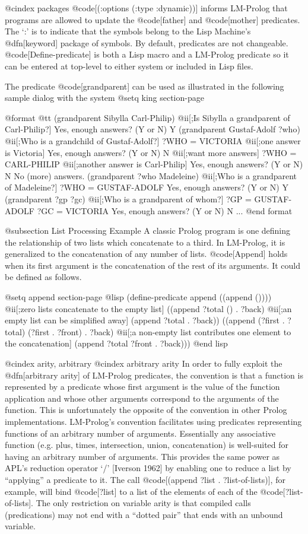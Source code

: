 {@cindex packages
@code[(:options (:type :dynamic))] informs LM-Prolog that programs are
allowed to update the @code[father] and @code[mother] predicates.
The `:' is to indicate that the symbols belong to the Lisp Machine's 
@dfn[keyword] package of symbols.
By default, predicates are not changeable.
@code[Define-predicate] is both a Lisp macro
and a LM-Prolog predicate so it can be
entered at top-level to either system or included in Lisp files.

The predicate @code[grandparent] can be used as illustrated in the following
sample dialog with the system
@setq king section-page

@format
@tt
(grandparent Sibylla Carl-Philip) @ii[;Is Sibylla a grandparent of Carl-Philip?]
Yes, enough answers? (Y or N) Y
(grandparent Gustaf-Adolf ?who) @ii[;Who is a grandchild of Gustaf-Adolf?]
?WHO = VICTORIA @ii[;one answer is Victoria]
Yes, enough answers? (Y or N) N @ii[;want more answers]
?WHO = CARL-PHILIP @ii[;another answer is Carl-Philip]
Yes, enough answers? (Y or N) N
No (more) answers.
(grandparent ?who Madeleine) @ii[;Who is a grandparent of Madeleine?]
?WHO = GUSTAF-ADOLF
Yes, enough answers? (Y or N) Y
(grandparent ?gp ?gc) @ii[;Who is a grandparent of whom?]
?GP = GUSTAF-ADOLF
?GC = VICTORIA
Yes, enough answers? (Y or N) N
...
@end format


@subsection List Processing Example
A classic Prolog program is one defining the relationship of two lists which
concatenate to a third. In LM-Prolog, 
it is generalized to the concatenation of any number of lists.
@code[Append] holds when its first argument is the concatenation of the 
rest of its arguments. It could be defined as follows.

@setq append section-page
@lisp
(define-predicate append
  ((append ()))) @ii[;zero lists concatenate to the empty list]
  ((append ?total () . ?back) @ii[;an empty list can be simplified away]
   (append ?total . ?back))
  ((append (?first . ?total) (?first . ?front) . ?back)
   @ii[;a non-empty list contributes one element to the concatenation]
   (append ?total ?front . ?back)))
@end lisp

@cindex arity, arbitrary
@cindex arbitrary arity
In order to fully exploit the @dfn[arbitrary arity] of LM-Prolog predicates,
the convention is that a function is represented by a predicate whose
first argument is the value of the function application and whose
other arguments correspond to the arguments of the function.
This is unfortunately the opposite of the
convention in other Prolog implementations.
LM-Prolog's convention facilitates using predicates
representing functions of an arbitrary number of arguments.
Essentially any associative function (e.g. plus, times, intersection,
union, concatenation) is well-suited for having an arbitrary number of
arguments.
This provides the same power as APL's reduction operator `/'
[Iverson 1962]
by enabling one to reduce a list by ``applying'' a predicate to it.
The call @code[(append ?list . ?list-of-lists)], for
example, will bind @code[?list] to a list of the elements of each of
the @code[?list-of-lists].
The only restriction on variable
arity is that compiled calls (predications) may not end with a
``dotted pair'' that ends with an unbound variable.

}
